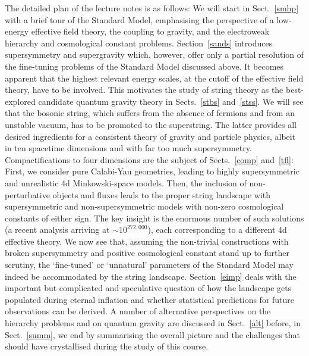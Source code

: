 \documentclass[12pt]{article}
\numberwithin{equation}{section}
\begin{document}
The detailed plan of the lecture notes is as follows: We will start in Sect.~\ref{smhp} with a brief tour of the Standard Model, emphasising the perspective of a low-energy effective field theory, the coupling to gravity, and the electroweak hierarchy and cosmological constant problems. Section~\ref{sands} introduces supersymmetry and supergravity which, however, offer only a partial resolution of the fine-tuning problems of the Standard Model discussed above. It becomes apparent that the highest relevant energy scales, at the cutoff of the effective field theory, have to be involved. This motivates the study of string theory as the best-explored candidate quantum gravity theory in Sects.~\ref{stbs} and~\ref{stss}. We will see that the bosonic string, which suffers from the absence of fermions and from an unstable vacuum, has to be promoted to the superstring. The latter provides all desired ingredients for a consistent theory of gravity and particle physics, albeit in ten spacetime dimensions and with far too much supersymmetry. Compactifications to four dimensions are the subject of Sects.~\ref{comp} and~\ref{tfl}: First, we consider pure Calabi-Yau geometries, leading to highly supersymmetric and unrealistic 4d Minkowski-space models. Then, the inclusion of non-perturbative objects and fluxes leads to the proper string landscape with supersymmetric and non-supersymmetric models with non-zero cosmological constants of either sign. The key insight is the enormous number of such solutions (a recent analysis arriving at $\sim 10^{272,000}$), each corresponding to a different 4d effective theory. We now see that, assuming the non-trivial constructions with broken supersymmetry and positive cosmological constant stand up to further scrutiny, the `fine-tuned' or `unnatural' parameters of the Standard Model may indeed be accommodated by the string landscape. Section~\ref{eimp} deals with the important but complicated and speculative question of how the landscape gets populated during eternal inflation and whether statistical predictions for future observations can be derived. A number of alternative perspectives on the hierarchy problems and on quantum gravity are discussed in Sect.~\ref{alt} before, in Sect.~\ref{summ}, we end by summarising the overall picture and the challenges that should have crystallised during the study of this course.
\end{document}
